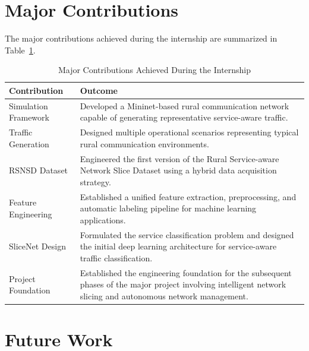 \documentclass[12pt,a4paper]{report}
\begin{document}
	\section{Major Contributions}
	
	The major contributions achieved during the internship are summarized in Table~\ref{tab:internship_contributions}.
	
	\begin{table}[H]
		\centering
		\caption{Major Contributions Achieved During the Internship}
		\label{tab:internship_contributions}
		
		\begin{tabular}{|p{5cm}|p{8cm}|}
			\hline
			
			\textbf{Contribution} &
			\textbf{Outcome}
			\\
			\hline
			
			Simulation Framework &
			Developed a Mininet-based rural communication network capable of generating representative service-aware traffic.
			\\
			\hline
			
			Traffic Generation &
			Designed multiple operational scenarios representing typical rural communication environments.
			\\
			\hline
			
			RSNSD Dataset &
			Engineered the first version of the Rural Service-aware Network Slice Dataset using a hybrid data acquisition strategy.
			\\
			\hline
			
			Feature Engineering &
			Established a unified feature extraction, preprocessing, and automatic labeling pipeline for machine learning applications.
			\\
			\hline
			
			SliceNet Design &
			Formulated the service classification problem and designed the initial deep learning architecture for service-aware traffic classification.
			\\
			\hline
			
			Project Foundation &
			Established the engineering foundation for the subsequent phases of the major project involving intelligent network slicing and autonomous network management.
			\\
			\hline
			
		\end{tabular}
		
	\end{table}
	\section{Future Work}
	
\end{document}
